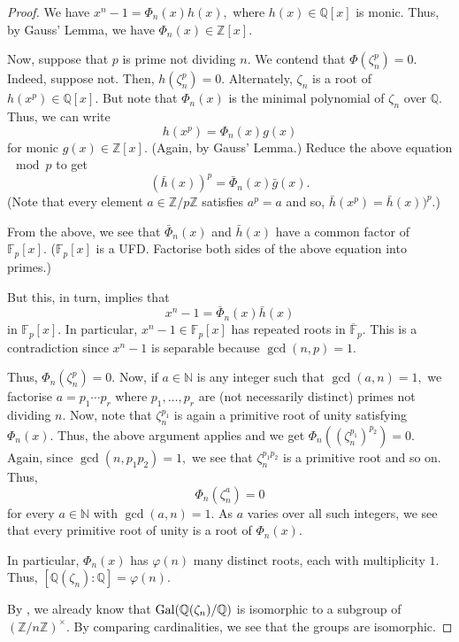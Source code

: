 \cyclotomicQ*\label{thm:cyclotomicQ2}
\begin{flushright}\hyperref[thm:cyclotomicQ]{\upsym}\end{flushright}
\begin{proof}
    We have $x^n - 1 = \Phi_n(x) h(x),$ where $h(x) \in \mathbb{Q}[x]$ is monic. Thus, by Gauss' Lemma, we have $\Phi_n(x) \in \mathbb{Z}[x].$

    Now, suppose that $p$ is prime not dividing $n.$ We contend that $\Phi(\zeta_n^p) = 0.$ Indeed, suppose not. Then, $h(\zeta_n^p) = 0.$ Alternately, $\zeta_n$ is a root of $h(x^p) \in \mathbb{Q}[x].$ But note that $\Phi_n(x)$ is the minimal polynomial of $\zeta_n$ over $\mathbb{Q}.$ Thus, we can write
    \begin{equation*} 
        h(x^p) = \Phi_n(x) g(x)
    \end{equation*}
    for monic $g(x) \in \mathbb{Z}[x].$ (Again, by Gauss' Lemma.) Reduce the above equation $\mod p$ to get
    \begin{equation*} 
        (\bar{h}(x))^p = \bar{\Phi}_n(x) \bar{g}(x).
    \end{equation*}
    (Note that every element $a \in \mathbb{Z}/p\mathbb{Z}$ satisfies $a^p = a$ and so, $\bar{h}(x^p) = \bar{h}(x))^p.$)

    From the above, we see that $\bar{\Phi}_n(x)$ and $\bar{h}(x)$ have a common factor of $\mathbb{F}_p[x].$ ($\mathbb{F}_p[x]$ is a UFD. Factorise both sides of the above equation into primes.)

    But this, in turn, implies that
    \begin{equation*} 
        x^n - 1 = \bar{\Phi}_n(x) \bar{h}(x)
    \end{equation*}
    in $\mathbb{F}_p[x].$ In particular, $x^n - 1 \in \mathbb{F}_p[x]$ has repeated roots in $\overline{\mathbb{F}}_p.$ This is a contradiction since $x^n - 1$ is separable because $\gcd(n, p) = 1.$

    Thus, $\Phi_n(\zeta_n^p) = 0.$ Now, if $a \in \mathbb{N}$ is any integer such that $\gcd(a, n) = 1,$ we factorise $a = p_1 \cdots p_r$ where $p_1, \ldots, p_r$ are (not necessarily distinct) primes not dividing $n.$ Now, note that $\zeta_n^{p_1}$ is again a primitive root of unity satisfying $\Phi_n(x).$ Thus, the above argument applies and we get $\Phi_n\left((\zeta_n^{p_1})^{p_2}\right) = 0.$ Again, since $\gcd(n, p_1p_2) = 1,$ we see that $\zeta_n^{p_1p_2}$ is a primitive root and so on. Thus, 
    \begin{equation*} 
        \Phi_n(\zeta_n^a) = 0
    \end{equation*}
    for every $a \in \mathbb{N}$ with $\gcd(a, n) = 1.$ As $a$ varies over all such integers, we see that every primitive root of unity is a root of $\Phi_n(x).$

    In particular, $\Phi_n(x)$ has $\varphi(n)$ many distinct roots, each with multiplicity $1.$ Thus, $[\mathbb{Q}(\zeta_n) : \mathbb{Q}] = \varphi(n).$

    By , we already know that $\operatorname{Gal}(\mathbb{Q}(\zeta_n)/\mathbb{Q})$ is isomorphic to a subgroup of $(\mathbb{Z}/n\mathbb{Z})^\times.$ By comparing cardinalities, we see that the groups are isomorphic.
\end{proof}

